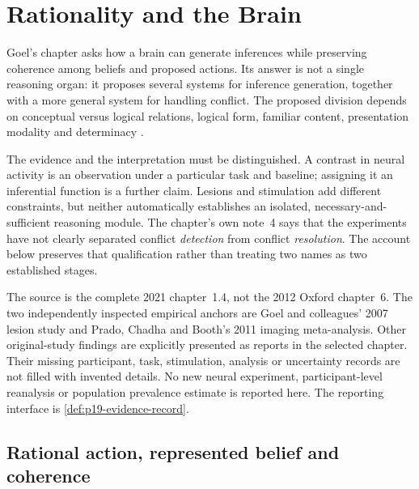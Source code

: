 \chapter{Rationality and the Brain}
\label{sec:p19-rationality-1-4}

Goel's chapter asks how a brain can generate inferences while preserving
coherence among beliefs and proposed actions. Its answer is not a single
reasoning organ: it proposes several systems for inference generation,
together with a more general system for handling conflict. The proposed
division depends on conceptual versus logical relations, logical form,
familiar content, presentation modality and determinacy
\cite[pp.~115--124]{Goel2021RationalityBrain}.

The evidence and the interpretation must be distinguished. A contrast in
neural activity is an observation under a particular task and baseline;
assigning it an inferential function is a further claim. Lesions and
stimulation add different constraints, but neither automatically establishes
an isolated, necessary-and-sufficient reasoning module. The chapter's own
note~4 says that the experiments have not clearly separated conflict
\emph{detection} from conflict \emph{resolution}. The account below preserves
that qualification rather than treating two names as two established stages.

The source is the complete 2021 chapter~1.4, not the 2012 Oxford chapter~6.
The two independently inspected empirical anchors are Goel and colleagues'
2007 lesion study and Prado, Chadha and Booth's 2011 imaging meta-analysis.
Other original-study findings are explicitly presented as reports in the
selected chapter. Their missing participant, task, stimulation, analysis or
uncertainty records are not filled with invented details. No new neural
experiment, participant-level reanalysis or population prevalence estimate
is reported here. The reporting interface is
\cref{def:p19-evidence-record}.

\section{Rational action, represented belief and coherence}
\label{sec:p19-r14-criteria}

